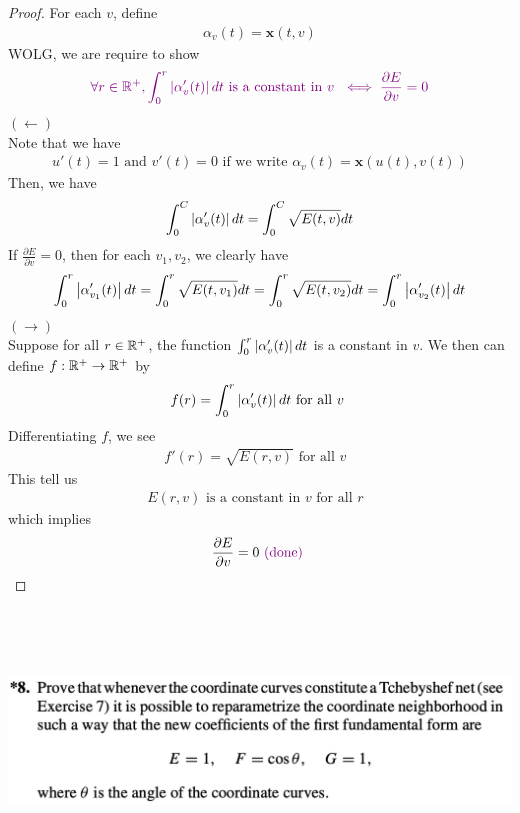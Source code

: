 \documentclass{report}
\begin{document}
\begin{proof}
For each $v$, define 
\begin{align*}
\alpha_v (t)=\textbf{x}(t,v)
\end{align*}
 WOLG, we are require to show  
\begin{align*}
  \textcolor{violet}{\forall r\in\mathbb{R}^+,\int_0^r \left|\alpha'_v(t)\right|dt\text{ is a constant in $v$ }\iff \frac{\partial E}{\partial v}=0}
\end{align*}
$(\longleftarrow)$\\

Note that we have 
\begin{align*}
u'(t)=1 \text{ and }v'(t)=0\text{ if we write }\alpha _v(t)=\textbf{x}(u(t),v(t))
\end{align*}
Then, we have 
\begin{align*}
\int_0^C \left|\alpha'_v(t)\right|dt=\int_0^C \sqrt{E(t,v)}dt
\end{align*}
If $ \frac{\partial E}{\partial v}=0$, then for each $v_1,v_2$, we clearly have  
 \begin{align*}
\int_0^r \left|\alpha '_{v_1}(t)\right|dt=\int_0^r\sqrt{E(t,v_1)}dt=\int_0^r \sqrt{E(t,v_2)}dt=\int_0^r \left|\alpha '_{v_2}(t)\right|dt
\end{align*}
$(\longrightarrow)$\\

Suppose for all $r\in\mathbb{R}^+$, the function $\int_0^r \left|\alpha '_v(t)\right|dt$ is a constant in $v$. We then can define  $f:\mathbb{R}^+\rightarrow \mathbb{R}^+$ by 
\begin{align*}
f(r)=\int_0^r \left|\alpha '_v(t)\right|dt\text{ for all $v$ }
\end{align*}
Differentiating $f$, we see 
 \begin{align*}
f'(r)=\sqrt{E(r,v)} \text{ for all $v$ }
\end{align*}
This tell us 
\begin{align*}
E(r,v)\text{ is a constant in $v$ for all $r$ }
\end{align*}
which implies 
\begin{align*}
\frac{\partial E}{\partial v}=0\textcolor{violet}{\text{ (done) }}
\end{align*}






\end{proof}
\begin{question}{}{}
\includegraphics[height=7cm,width=18cm]{hw4q11}
\end{question}
\end{document}
